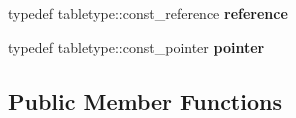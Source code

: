 \begin{DoxyCompactItemize}
\item 
typedef tabletype\+::const\+\_\+reference {\bfseries reference}\hypertarget{classspp___1_1const__table__iterator_a186b7199c4d0690974a70b661a3f86ec}{}\label{classspp___1_1const__table__iterator_a186b7199c4d0690974a70b661a3f86ec}

\item 
typedef tabletype\+::const\+\_\+pointer {\bfseries pointer}\hypertarget{classspp___1_1const__table__iterator_a25f94518def7822176f8598df49a4e10}{}\label{classspp___1_1const__table__iterator_a25f94518def7822176f8598df49a4e10}

\end{DoxyCompactItemize}
\subsection*{Public Member Functions}
